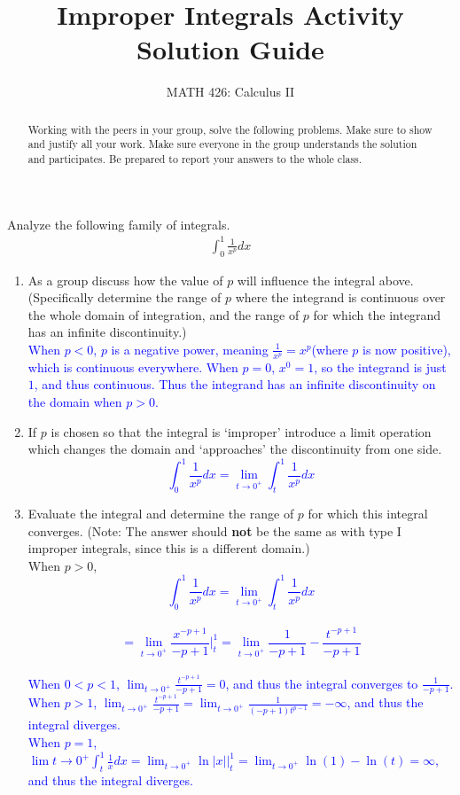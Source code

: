 \documentclass{ximera}
\title{Improper Integrals Activity Solution Guide}
\author{MATH 426: Calculus II}
\begin{document}
\begin{abstract}
   Working with the peers in your group, solve the following problems. Make sure to show and justify all your work. Make sure everyone in the group understands the solution and participates. Be prepared to report your answers to the whole class. 
\end{abstract}
\maketitle

\begin{exercise}
Analyze the following family of integrals.
\begin{align}
	\int_{0}^1 \frac{1}{x^p} dx \nonumber
\end{align}
\begin{enumerate}
\item As a group discuss how the value of $p$ will influence the integral above. (Specifically determine the range of $p$ where the integrand is continuous over the whole domain of integration, and the range of $p$ for which the integrand has an infinite discontinuity.)\\
    \textcolor{blue}{When $p<0$, $p$ is a negative power, meaning $\frac{1}{x^p}=x^p$(where $p$ is now positive), which is continuous everywhere.  When $p=0$, $x^{0}=1$, so the integrand is just $1$, and thus continuous.  Thus the integrand has an infinite discontinuity on the domain when $p>0$.}

\item If $p$ is chosen so that the integral is `improper' introduce a limit operation which changes the domain and `approaches' the discontinuity from one side.\\
    \textcolor{blue}{$$\int_0^1\frac{1}{x^p}dx=\lim_{t\to 0^+}\int_t^1\frac{1}{x^p}dx$$}
\item Evaluate the integral and determine the range of $p$ for which this integral converges. (Note: The answer should {\bf{not}} be the same as with type I improper integrals, since this is a different domain.)\\When $p>0$,\\
    \textcolor{blue}{$$\int_0^1\frac{1}{x^p}dx=\lim_{t\to 0^+}\int_t^1\frac{1}{x^p}dx$$\\
$$=\lim_{t\rightarrow 0^+}\frac{x^{-p+1}}{-p+1}\bigg|_t^1=\lim_{t\rightarrow 0^+}\frac{1}{-p+1}-\frac{t^{-p+1}}{-p+1}$$\\
When $0<p<1$, $\lim_{t\rightarrow 0^+}\frac{t^{-p+1}}{-p+1}=0$, and thus the integral converges to $\frac{1}{-p+1}$. \\
When $p>1$, $\lim_{t\rightarrow 0^+}\frac{t^{-p+1}}{-p+1}=\lim_{t\rightarrow 0^+}\frac{1}{(-p+1)t^{p-1}}=-\infty$, and thus the integral diverges.\\
When $p=1$, $\lim{t\rightarrow 0^+}\int_t^1 \frac1{x}dx=\lim_{t\rightarrow 0^+}\ln|x|\bigg|_t^1=\lim_{t\rightarrow 0^+}\ln(1)-\ln(t)=\infty$, and thus the integral diverges.}
\end{enumerate}
\end{exercise}
\end{document}
